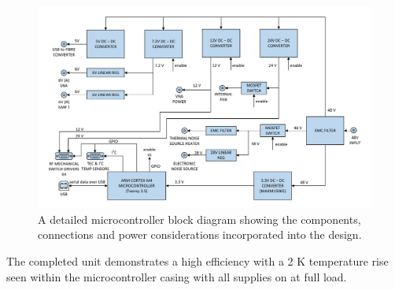 \begin{figure}
    \centering
    \includegraphics[width=\textwidth]{updated_controller_detail}
    \caption{A detailed microcontroller block diagram showing the components, connections and power considerations incorporated into the design.}
    \label{fig:ucon_block}
\end{figure}
The completed unit demonstrates a high efficiency with a 2 K temperature rise seen within the microcontroller casing with all supplies on at full load.


